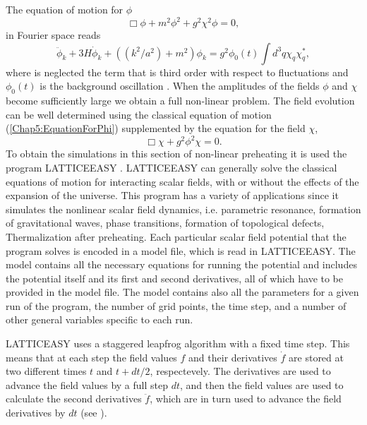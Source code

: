 \documentclass[11pt,a4paper,twoside]{book}
\begin{document}
 The equation of motion for $\phi$
\begin{equation}
\label{Chap5:EquationForPhi}
\Box\phi + m^{2}\phi^{2} + g^{2}\chi^{2}\phi = 0,
\end{equation}
in Fourier space reads
\begin{equation}
\label{Chap5:EquationForPhiFourierSpace}
\ddot{\phi}_{k} + 3H\dot{\phi}_{k} + ((k^{2}/a^{2}) + m^{2})\phi_{k} = g^{2}\phi_{0}(t) \int d^{3}q\chi_{q}\chi_{q}^{*},
\end{equation}
where is neglected the term that is third order with respect to fluctuations and $\phi_{0}(t)$ is the background oscillation \cite{Chap5:Fragmentation}. When the amplitudes of the fields $\phi$ and $\chi$ become sufficiently large we obtain a full non-linear problem. The field evolution can be well determined using the classical equation of motion (\ref{Chap5:EquationForPhi}) supplemented by the equation for the field $\chi$,
\begin{equation}
\label{	Chap5:ChaoticModelEquationForChi}
\Box \chi + g^{2}\phi^{2}\chi=0.
\end{equation}
To obtain the simulations in this section of non-linear preheating it is used the program LATTICEEASY \cite{Chap5:Latticeeasy}. LATTICEEASY can generally solve the classical equations of motion for interacting scalar fields, with or without the effects of the expansion of the universe. This program has a variety of applications since it simulates the nonlinear scalar field dynamics, i.e. parametric resonance, formation of gravitational waves, phase transitions, formation of topological defects, Thermalization after preheating. Each particular scalar field potential that the program solves is encoded in a model file, which is read in LATTICEEASY. The model contains all the necessary equations for running the potential and includes the potential itself and its first and second derivatives, all of which have to be provided in the model file. The model contains also all the parameters for a given run of the program, the number of grid points, the time step, and a number of other general variables specific to each run.

 LATTICEASY uses a staggered leapfrog algorithm with a fixed time step. This means that at each step the field values $ f $ and their derivatives $\dot{f}$ are stored at two different times $ t $ and $ t + dt/2 $, respectevely. The derivatives are used to advance the field values by a full step $ dt $, and then the field values are used to calculate the second derivatives $\ddot{f}$, which are in turn used to advance the field derivatives by $ dt$ (see \cite{Chap5:Latticeeasy}).
 
\end{document}
